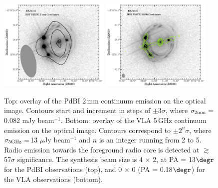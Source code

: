 \documentclass[]{emulateapj}
\newcommand{\pmOne}{\mbox{$^{-1}$}\xspace}
\begin{document}
\begin{figure}[!htbp]
\includegraphics[trim=12 27 0 1, clip, width=0.47\textwidth]{f4a.pdf}
\includegraphics[trim=10 5 0 0, clip, width=0.47\textwidth]{f4b.pdf}
\caption{Top: overlay of the PdBI 2\,mm continuum emission on the optical image.
Contours start and increment in steps of
$\pm$3$\sigma$, where $\sigma_{\rm 2mm}$\,=\,0.082 mJy beam\pmOne.
Bottom: overlay of the VLA 5\,GHz continuum emission on the optical image.
Contours correspond to $\pm2^n\sigma$, where
$\sigma_{\rm 5GHz}$\,=\,13 $\mu$Jy beam\pmOne
and $n$ is an integer running from 2 to 5.
Radio emission towards the foreground radio core is detected at $\gtrsim$57$\sigma$ significance.
The synthesis beam size is 4 $\times$ 2, at PA = 13$\degr$ for
the PdBI observations (top), and
0 $\times$ 0 (PA = 0.18$\degr$) for
the VLA observations (bottom).
\label{fig:cont}}\vspace{0.51em}
\end{figure}
\end{document}
